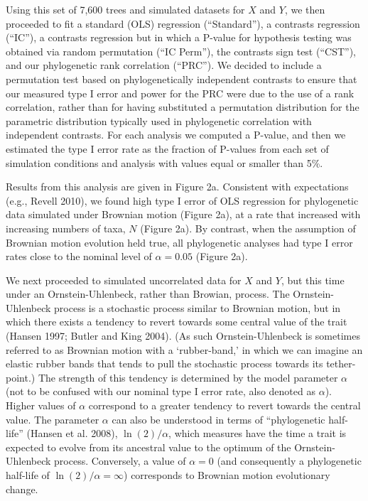 \documentclass[fleqn,10pt,lineno]{wlpeerj} %
\begin{document}
Using this set of 7,600 trees and simulated datasets for \(X\) and \(Y\), we then proceeded to fit a standard (OLS) regression (``Standard''), a contrasts regression (``IC''), a contrasts regression but in which a P-value for hypothesis testing was obtained via random permutation (``IC Perm''), the contrasts sign test (``CST''), and our phylogenetic rank correlation (``PRC''). We decided to include a permutation test based on phylogenetically independent contrasts to ensure that our measured type I error and power for the PRC were due to the use of a rank correlation, rather than for having substituted a permutation distribution for the parametric distribution typically used in phylogenetic correlation with independent contrasts. For each analysis we computed a P-value, and then we estimated the type I error rate as the fraction of P-values from each set of simulation conditions and analysis with values equal or smaller than 5\%.

Results from this analysis are given in Figure 2a. Consistent with expectations (e.g., Revell 2010), we found high type I error of OLS regression for phylogenetic data simulated under Brownian motion (Figure 2a), at a rate that increased with increasing numbers of taxa, \(N\) (Figure 2a). By contrast, when the assumption of Brownian motion evolution held true, all phylogenetic analyses had type I error rates close to the nominal level of \(\alpha = 0.05\) (Figure 2a).

We next proceeded to simulated uncorrelated data for \(X\) and \(Y\), but this time under an Ornstein-Uhlenbeck, rather than Browian, process. The Ornstein-Uhlenbeck process is a stochastic process similar to Brownian motion, but in which there exists a tendency to revert towards some central value of the trait (Hansen 1997; Butler and King 2004). (As such Ornstein-Uhlenbeck is sometimes referred to as Brownian motion with a `rubber-band,' in which we can imagine an elastic rubber bands that tends to pull the stochastic process towards its tether-point.) The strength of this tendency is determined by the model parameter \(\alpha\) (not to be confused with our nominal type I error rate, also denoted as \(\alpha\)). Higher values of \(\alpha\) correspond to a greater tendency to revert towards the central value. The parameter \(\alpha\) can also be understood in terms of ``phylogenetic half-life'' (Hansen et al. 2008), \(\ln(2)/\alpha\), which measures have the time a trait is expected to evolve from its ancestral value to the optimum of the Ornstein-Uhlenbeck process. Conversely, a value of \(\alpha = 0\) (and consequently a phylogenetic half-life of \(\ln(2)/\alpha = \infty\)) corresponds to Brownian motion evolutionary change.
\end{document}
